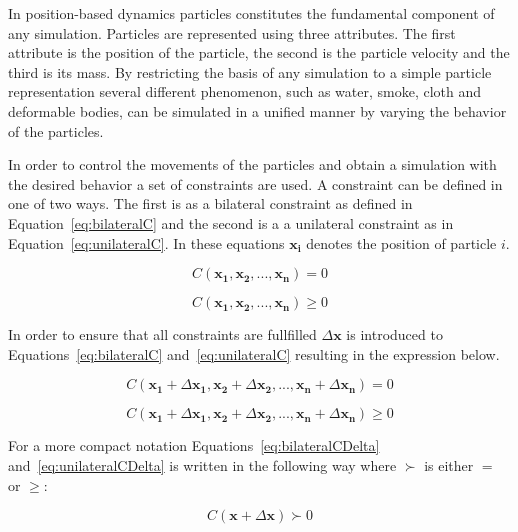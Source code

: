 In position-based dynamics particles constitutes the fundamental component of
any simulation.  Particles are represented using three attributes. The first
attribute is the position of the particle, the second is the particle velocity
and the third is its mass. By restricting the basis of any simulation to a
simple particle representation several different phenomenon, such as water,
smoke, cloth and deformable bodies, can be simulated in a unified manner by
varying the behavior of the particles.

In order to control the movements of the particles and obtain a simulation with
the desired behavior a set of constraints are used. A constraint can be defined
in one of two ways. The first is as a bilateral constraint as defined in
Equation~\ref{eq:bilateralC} and the second is a a unilateral constraint as in
Equation~\ref{eq:unilateralC}. In these equations $ \mathbf{x_{i}} $ denotes
the position of particle $ i $.

\begin{equation}
\label{eq:bilateralC}
C(\mathbf{x_{1}}, \mathbf{x_{2}}, ..., \mathbf{x_{n}}) = 0
\end{equation}

\begin{equation}
\label{eq:unilateralC}
C(\mathbf{x_{1}}, \mathbf{x_{2}}, ..., \mathbf{x_{n}}) \geq 0
\end{equation}

In order to ensure that all constraints are fullfilled $ \Delta \mathbf{x} $ is
introduced to Equations~\ref{eq:bilateralC} and~\ref{eq:unilateralC} resulting
in the expression below.

\begin{equation}
\label{eq:bilateralCDelta}
C(\mathbf{x_{1}} + \Delta \mathbf{x_{1}}, \mathbf{x_{2}} + \Delta \mathbf{x_{2}}, ..., \mathbf{x_{n}} + \Delta \mathbf{x_{n}}) = 0
\end{equation}

\begin{equation}
\label{eq:unilateralCDelta}
C(\mathbf{x_{1}} + \Delta \mathbf{x_{1}}, \mathbf{x_{2}} + \Delta \mathbf{x_{2}}, ..., \mathbf{x_{n}} + \Delta \mathbf{x_{n}}) \geq 0
\end{equation}

For a more compact notation Equations~\ref{eq:bilateralCDelta}
and~\ref{eq:unilateralCDelta} is written in the following way
where $ \succ $ is either $ = $ or $ \geq $:

\begin{equation}
\label{eq:cCombined}
C(\mathbf{x} + \Delta \mathbf{x}) \succ 0
\end{equation}

